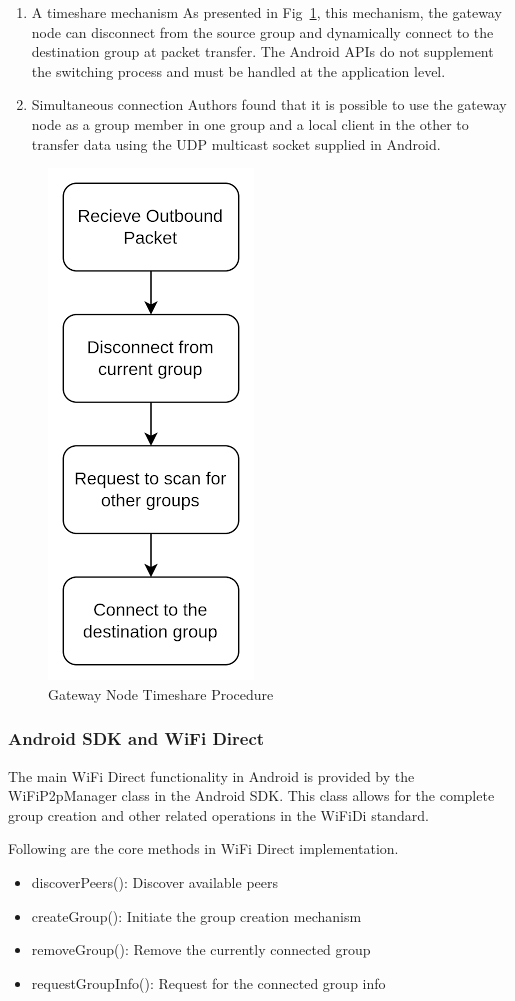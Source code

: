 \documentclass[12pt, conference, onecolumn, a4paper]{IEEEtran}
\begin{document}
\begin{enumerate}
    \item A timeshare mechanism
          As presented in Fig~\ref{timeshare}, this mechanism, the gateway node
          can
          disconnect from the source group
          and dynamically connect to the destination group at packet transfer.
          The
          Android APIs do not supplement the switching process and must be
          handled at the
          application level\cite{funai2015}.
    \item Simultaneous connection
          Authors found that it is possible to use the gateway node as a group
          member
          in one group and a local client in the other to transfer data using
          the UDP
          multicast socket supplied in Android\cite{funai2015}.
\end{enumerate}

\begin{figure}[htbp]
    \centerline{\includegraphics[height=0.45\textwidth]{imgs/timeshare.png}}
    \caption{Gateway Node Timeshare Procedure}
    \label{timeshare}
\end{figure}

\vspace{0.3cm}

\subsubsection{Android SDK and WiFi Direct}
The main WiFi Direct functionality in Android is provided by the WiFiP2pManager
class in the Android SDK. This class allows for the complete group creation and
other related operations in the WiFiDi standard.

Following are the core methods in WiFi Direct implementation\cite{wifiman}.

\begin{itemize}
    \item discoverPeers(): Discover available peers
    \item createGroup(): Initiate the group creation mechanism
    \item removeGroup(): Remove the currently connected group
    \item requestGroupInfo(): Request for the connected group info
\end{itemize}
\end{document}
